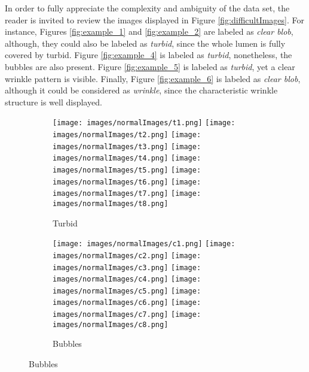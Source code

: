 \documentclass[review,12pt,3p]{elsarticle}
\begin{document}
In order to fully appreciate the complexity and ambiguity of the data set, the reader is invited to review the images displayed in Figure \ref{fig:difficultImages}. For instance, Figures \ref{fig:example_1} and \ref{fig:example_2} are labeled as \emph{clear blob}, although, they could  also be labeled as \emph{turbid}, since the whole lumen is fully covered by turbid. Figure \ref{fig:example_4} is labeled as \emph{turbid}, nonetheless, the bubbles are also present. Figure \ref{fig:example_5} is labeled as \emph{turbid}, yet a clear wrinkle pattern is visible. Finally, Figure \ref{fig:example_6} is labeled as \emph{clear blob}, although it could be considered as \emph{wrinkle}, since the characteristic wrinkle structure is well displayed.

\begin{figure}
        \centering
        
        \begin{subfigure}[b]{0.5\textwidth}
                \texttt{[image: images/normalImages/t1.png]}
                \texttt{[image: images/normalImages/t2.png]}
                \texttt{[image: images/normalImages/t3.png]}
                \texttt{[image: images/normalImages/t4.png]}
                \texttt{[image: images/normalImages/t5.png]}
                \texttt{[image: images/normalImages/t6.png]}
                \texttt{[image: images/normalImages/t7.png]}
                \texttt{[image: images/normalImages/t8.png]}
                \caption{Turbid}\label{fig:dataset_1}
        \end{subfigure}%
        
        \begin{subfigure}[b]{0.5\textwidth}
                \texttt{[image: images/normalImages/c1.png]}
                \texttt{[image: images/normalImages/c2.png]}
                \texttt{[image: images/normalImages/c3.png]}
                \texttt{[image: images/normalImages/c4.png]}
                \texttt{[image: images/normalImages/c5.png]}
                \texttt{[image: images/normalImages/c6.png]}
                \texttt{[image: images/normalImages/c7.png]}
                \texttt{[image: images/normalImages/c8.png]}
                \caption{Bubbles}\label{fig:dataset_2}
        \end{subfigure}%
        

\end{figure}
\end{document}
